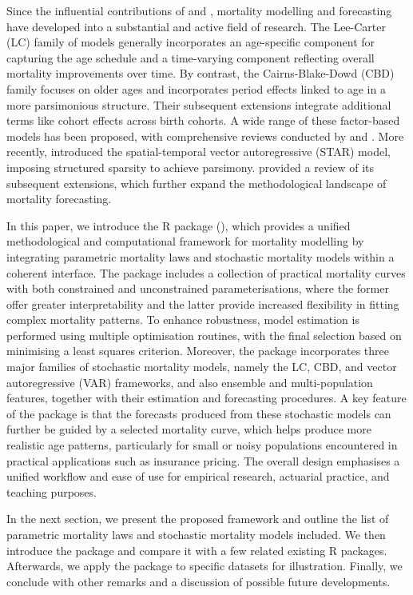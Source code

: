 Since the influential contributions of \citet{Lee1992} and \citet{Cairns2006}, mortality modelling and forecasting have developed into a substantial and active field of research. The Lee-Carter (LC) family of models generally incorporates an age-specific component for capturing the age schedule and a time-varying component reflecting overall mortality improvements over time. By contrast, the Cairns-Blake-Dowd (CBD) family focuses on older ages and incorporates period effects linked to age in a more parsimonious structure. Their subsequent extensions integrate additional terms like cohort effects across birth cohorts. A wide range of these factor-based models has been proposed, with comprehensive reviews conducted by \citet{Cairns2009} and \citet{Haberman2011}. More recently, \citet{LiLu2017} introduced the spatial-temporal vector autoregressive (STAR) model, imposing structured sparsity to achieve parsimony. \citet{Li2024} provided a review of its subsequent extensions, which further expand the methodological landscape of mortality forecasting.

In this paper, we introduce the  R package (\citet{Li2026}), which provides a unified methodological and computational framework for mortality modelling by integrating parametric mortality laws and stochastic mortality models within a coherent interface. The package includes a collection of practical mortality curves with both constrained and unconstrained parameterisations, where the former offer greater interpretability and the latter provide increased flexibility in fitting complex mortality patterns. To enhance robustness, model estimation is performed using multiple optimisation routines, with the final selection based on minimising a least squares criterion. Moreover, the  package incorporates three major families of stochastic mortality models, namely the LC, CBD, and vector autoregressive (VAR) frameworks, and also ensemble and multi-population features, together with their estimation and forecasting procedures. A key feature of the package is that the forecasts produced from these stochastic models can further be guided by a selected mortality curve, which helps produce more realistic age patterns, particularly for small or noisy populations encountered in practical applications such as insurance pricing. The overall design emphasises a unified workflow and ease of use for empirical research, actuarial practice, and teaching purposes.

In the next section, we present the proposed framework and outline the list of parametric mortality laws and stochastic mortality models included. We then introduce the  package and compare it with a few related existing R packages. Afterwards, we apply the  package to specific datasets for illustration. Finally, we conclude with other remarks and a discussion of possible future developments.

